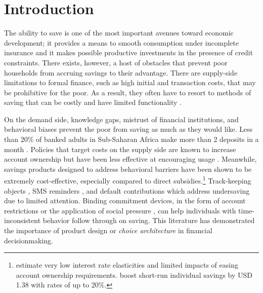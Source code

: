 \documentclass[11pt]{article}
\begin{document}
\newpage

\section{Introduction}




	The ability to save is one of the most important avenues toward economic development; it provides a means to smooth consumption under incomplete insurance and it makes possible productive investments in the presence of credit constraints. There exists, however, a host of obstacles that prevent poor households from accruing savings to their advantage. There are supply-side limitations to formal finance, such as high initial and transaction costs, that may be prohibitive for the poor. As a result, they often have to resort to methods of saving that can be costly and have limited functionality \parencite{collins_portfolios_2009,karlan_savings_2014,banerjee_economic_2007,schaner_cost_2011}. 

	On the demand side, knowledge gaps, mistrust of financial institutions, and behavioral biases prevent the poor from saving as much as they would like. Less than 20\% of banked adults in Sub-Saharan Africa make more than 2 deposits in a month \parencite{demirguc-kunt_global_2015}. Policies that target costs on the supply side are known to increase account ownership but have been less effective at encouraging usage \parencite{dupas_why_2013,karlan_banking_2016}. Meanwhile, savings products designed to address behavioral barriers have been shown to be extremely cost-effective, especially compared to direct subsidies.\footnote{\textcite{karlan_price_2018} estimate very low interest rate elasticities and limited impacts of easing account ownership requirements. \textcite{schaner_persistent_2018} boost short-run individual savings by USD 1.38 with rates of up to 20\%.} Track-keeping objects \parencite{akbas_how_2016}, SMS reminders \parencite{karlan_getting_2010}, and default contributions \parencite{thaler_save_2004,chetty_active_2014,somville_saving_2018} which address undersaving due to limited attention. Binding commitment devices, in the form of account restrictions \parencite{ashraf_tying_2006} or the application of social pressure \parencite{dupas_why_2013}, can help individuals with time-inconsistent behavior follow through on saving. This literature has demonstrated the importance of product design or \textit{choice architecture} in financial decisionmaking.
\end{document}
